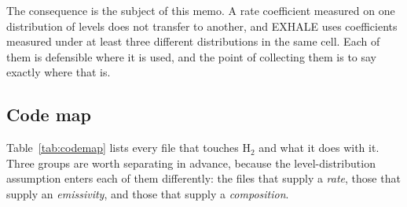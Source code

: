 \documentclass[english,a4paper]{my_memo}
\begin{document}
The consequence is the subject of this memo. A rate coefficient measured on
one distribution of levels does not transfer to another, and EXHALE uses
coefficients measured under at least three different distributions in the same
cell. Each of them is defensible where it is used, and the point of collecting
them is to say exactly where that is.

\subsection{Code map}

Table~\ref{tab:codemap} lists every file that touches H$_2$ and what it does
with it. Three groups are worth separating in advance, because the
level-distribution assumption enters each of them differently: the files that
supply a \emph{rate}, those that supply an \emph{emissivity}, and those that
supply a \emph{composition}.
\end{document}
